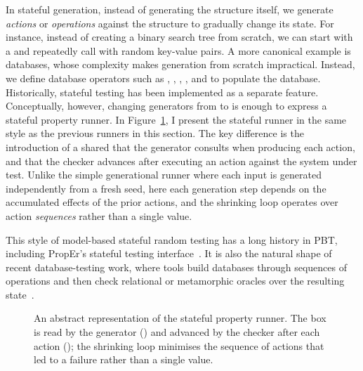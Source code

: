 In stateful generation, instead of generating the structure itself, we generate
\emph{actions} or \emph{operations} against the structure to gradually change its
state. For instance, instead of creating a binary search tree from scratch, we can
start with a  and repeatedly call  with random key-value pairs.
A more canonical example is databases, whose complexity makes generation from scratch
impractical. Instead, we define database operators such as ,
, , , and  to populate the
database. Historically, stateful testing has been implemented as a separate feature.
Conceptually, however, changing generators from  to  is enough to express a stateful property runner. In
Figure~\ref{fig:stateful-property-runner}, I present the stateful runner in the same
style as the previous runners in this section. The key difference is the introduction
of a shared  that the generator consults when producing each action, and
that the checker advances after executing an action against the system under test.
Unlike the simple generational runner where each input is generated independently from
a fresh seed, here each generation step depends on the accumulated effects of the prior
actions, and the shrinking loop operates over action \emph{sequences} rather than a
single value.

This style of model-based stateful random testing has a long history in PBT, including
PropEr's stateful testing interface~\cite{arvaniti-thesis-11}. It is also the natural
shape of recent database-testing work, where tools build databases through sequences of
operations and then check relational or metamorphic oracles over the resulting
state~\cite{SQLancer,rigger.pqs,rigger.norec,rigger.tlp,dirt-dbtest26,chou2025modelfree}.

\begin{figure}[h!]
  \centering
  \resizebox{0.95\linewidth}{!}{}
  \caption[An abstract representation of the stateful property runner.]{An abstract representation of the stateful property runner. The
     box is read by the generator () and advanced by the
    checker after each action (); the shrinking loop minimises the
    sequence of actions  that led to a failure rather than a single
    value.}
  \label{fig:stateful-property-runner}
\end{figure}

